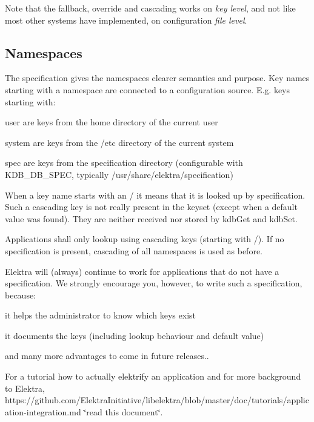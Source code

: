 Note that the fallback, override and cascading works on {\itshape key level}, and not like most other systems have implemented, on configuration {\itshape file level}.

\subsection*{Namespaces}

The specification gives the namespaces clearer semantics and purpose. Key names starting with a namespace are connected to a configuration source. E.\+g. keys starting with\+:


\begin{DoxyItemize}
\item {\ttfamily user} are keys from the home directory of the current user
\item {\ttfamily system} are keys from the {\ttfamily /etc} directory of the current system
\item {\ttfamily spec} are keys from the specification directory (configurable with K\+D\+B\+\_\+\+D\+B\+\_\+\+S\+P\+E\+C, typically {\ttfamily /usr/share/elektra/specification})
\end{DoxyItemize}

When a key name starts with an {\ttfamily /} it means that it is looked up by specification. Such a cascading key is not really present in the keyset (except when a default value was found). They are neither received nor stored by {\ttfamily kdb\+Get} and {\ttfamily kdb\+Set}.

Applications shall only lookup using cascading keys (starting with {\ttfamily /}). If no specification is present, cascading of all namespaces is used as before.

Elektra will (always) continue to work for applications that do not have a specification. We strongly encourage you, however, to write such a specification, because\+:


\begin{DoxyItemize}
\item it helps the administrator to know which keys exist
\item it documents the keys (including lookup behaviour and default value)
\item and many more advantages to come in future releases..
\end{DoxyItemize}

For a tutorial how to actually elektrify an application and for more background to Elektra, https\+://github.com/\+Elektra\+Initiative/libelektra/blob/master/doc/tutorials/application-\/integration.\+md \char`\"{}read this document\char`\"{}.

